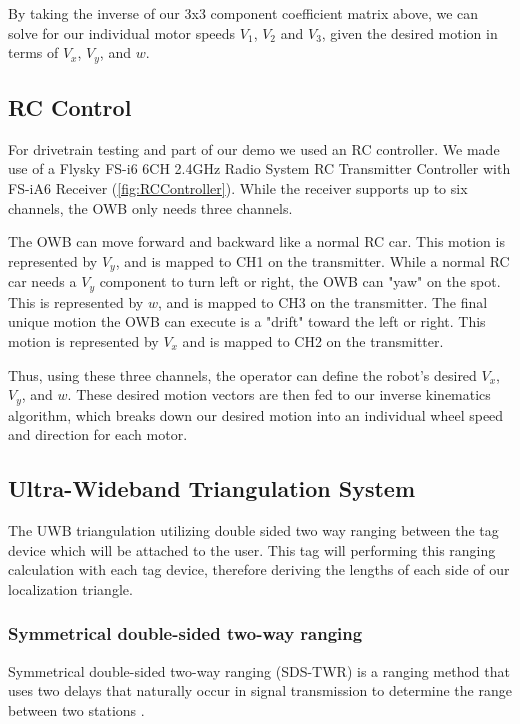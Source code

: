 \documentclass{report}
\begin{document}
    By taking the inverse of our 3x3 component coefficient matrix above, we can solve for our individual motor speeds $V_1$, $V_2$ and $V_3$, given the desired motion in terms of $V_x$, $V_y$, and $w$.

    \subsection{RC Control}
    For drivetrain testing and part of our demo we used an RC controller. We made use of a Flysky FS-i6 6CH 2.4GHz Radio System RC Transmitter Controller with FS-iA6 Receiver (\ref{fig:RCController}). While the receiver supports up to six channels, the OWB only needs three channels. 

    The OWB can move forward and backward like a normal RC car. This motion is represented by $V_y$, and is mapped to CH1 on the transmitter. While a normal RC car needs a $V_y$ component to turn left or right, the OWB can "yaw" on the spot. This is represented by $w$, and is mapped to CH3 on the transmitter. The final unique motion the OWB can execute is a "drift" toward the left or right. This motion is represented by $V_x$ and is mapped to CH2 on the transmitter.

    Thus, using these three channels, the operator can define the robot's desired $V_x$, $V_y$, and $w$. These desired motion vectors are then fed to our inverse kinematics algorithm, which breaks down our desired motion into an individual wheel speed and direction for each motor.

    \subsection{Ultra-Wideband Triangulation System}

    The UWB triangulation utilizing double sided two way ranging between the tag device which will be attached to the user. This tag will performing this ranging calculation with each tag device, therefore deriving the lengths of each side of our localization triangle.

    \subsubsection{Symmetrical double-sided two-way ranging}
    Symmetrical double-sided two-way ranging (SDS-TWR) is a ranging method that uses two delays that naturally occur in signal transmission to determine the range between two stations \cite{IEEE_802}.
\end{document}
